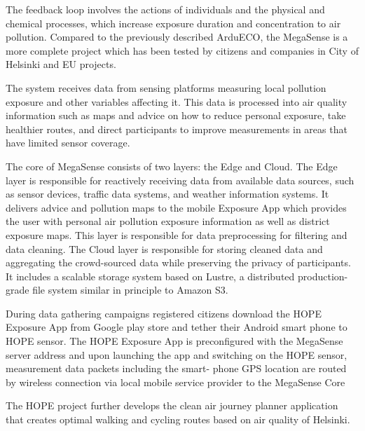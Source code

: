 			\begin{minipage}{0.65\textwidth}\raggedright
				The feedback loop involves the actions of individuals and the physical and chemical processes, which increase exposure duration and concentration to air pollution. 
				Compared to the previously described ArduECO, the MegaSense is a more complete project which has been tested by citizens and companies in City of Helsinki and EU projects.
				
				The system receives data from sensing platforms
				measuring local pollution exposure and other variables affecting it. This data is processed into air quality information such
				as maps and advice on how to reduce personal exposure, take
				healthier routes, and direct participants to improve measurements in areas that have limited sensor coverage.
			\end{minipage}
		
			The core of MegaSense consists of two layers: the Edge and
			Cloud. The Edge layer is responsible for reactively receiving
			data from available data sources, such as sensor devices,
			traffic data systems, and weather information systems. It
			delivers advice and pollution maps to the mobile Exposure App
			which provides the user with personal air pollution exposure
			information as well as district exposure maps.
			This layer is responsible for data preprocessing for filtering
			and data cleaning.
			The Cloud layer is responsible for storing cleaned data
			and aggregating the crowd-sourced data while preserving the
			privacy of participants. It includes a scalable storage system
			based on Lustre, a distributed production-grade file system
			similar in principle to Amazon S3.
			
			During data gathering campaigns registered citizens download the HOPE Exposure App from Google play store and
			tether their Android smart phone to HOPE sensor. The HOPE
			Exposure App is preconfigured with the MegaSense server
			address and upon launching the app and switching on the
			HOPE sensor, measurement data packets including the smart-
			phone GPS location are routed by wireless connection via local
			mobile service provider to the MegaSense Core
			
			The HOPE project further develops the clean air journey
			planner application that creates optimal walking and cycling
			routes based on air quality of Helsinki.